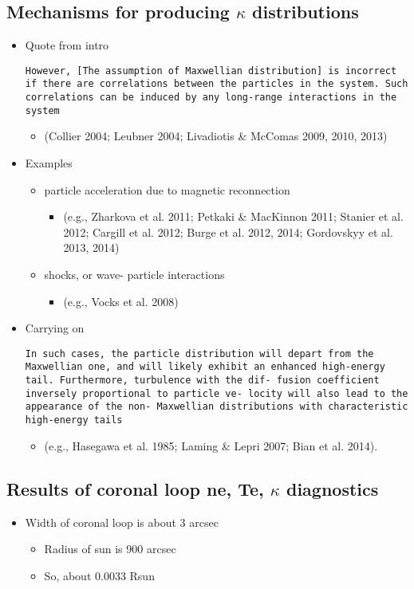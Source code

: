 \documentclass[11pt]{article}
\begin{document}
\subsection{Mechanisms for producing \(\kappa\) distributions}
\label{sec:orgheadline8}
\begin{itemize}
\item Quote from intro
\begin{verbatim}
However, [The assumption of Maxwellian distribution] is incorrect if there are correlations between the particles in the system. Such correlations can be induced by any long-range interactions in the system
\end{verbatim}
\begin{itemize}
\item (Collier 2004; Leubner 2004; Livadiotis \& McComas 2009, 2010, 2013)
\end{itemize}
\item Examples
\begin{itemize}
\item particle acceleration due to magnetic reconnection
\begin{itemize}
\item (e.g., Zharkova et al. 2011; Petkaki \& MacKinnon 2011; Stanier et al. 2012; Cargill et al. 2012; Burge et al. 2012, 2014; Gordovskyy et al. 2013, 2014)
\end{itemize}
\item shocks, or wave- particle interactions
\begin{itemize}
\item (e.g., Vocks et al. 2008)
\end{itemize}
\end{itemize}
\item Carrying on
\begin{verbatim}
In such cases, the particle distribution will depart from the Maxwellian one, and will likely exhibit an enhanced high-energy tail. Furthermore, turbulence with the dif- fusion coefficient inversely proportional to particle ve- locity will also lead to the appearance of the non- Maxwellian distributions with characteristic high-energy tails
\end{verbatim}
\begin{itemize}
\item (e.g., Hasegawa et al. 1985; Laming \& Lepri 2007; Bian et al. 2014).
\end{itemize}
\end{itemize}
\subsection{Results of coronal loop ne, Te, \(\kappa\) diagnostics}
\label{sec:orgheadline9}
\begin{itemize}
\item Width of coronal loop is about 3 arcsec
\begin{itemize}
\item Radius of sun is 900 arcsec
\item So, about 0.0033 Rsun
\end{itemize}
\end{itemize}
\end{document}

